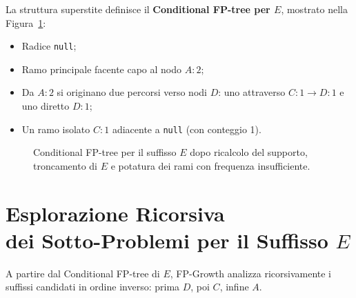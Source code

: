 La struttura superstite definisce il \textbf{Conditional FP-tree per $E$}, mostrato nella Figura~\ref{fig:dm-fp-conditional-e}:
\begin{itemize}
    \item Radice \texttt{null};
    \item Ramo principale facente capo al nodo $A:2$;
    \item Da $A:2$ si originano due percorsi verso nodi $D$: uno attraverso $C:1 \to D:1$ e uno diretto $D:1$;
    \item Un ramo isolato $C:1$ adiacente a \texttt{null} (con conteggio 1).
\end{itemize}

\begin{figure}[H]
\centering
{}
\caption{Conditional FP-tree per il suffisso $E$ dopo ricalcolo del supporto, troncamento di $E$ e potatura dei rami con frequenza insufficiente.}
\label{fig:dm-fp-conditional-e}
\end{figure}

\FloatBarrier
\section[Esplorazione Ricorsiva per il Suffisso $E$]{Esplorazione Ricorsiva\\dei Sotto-Problemi per il Suffisso $E$}
\label{sec:dm-fp-recursive-e}

A partire dal Conditional FP-tree di $E$, FP-Growth analizza ricorsivamente i suffissi candidati in ordine inverso: prima $D$, poi $C$, infine $A$.

